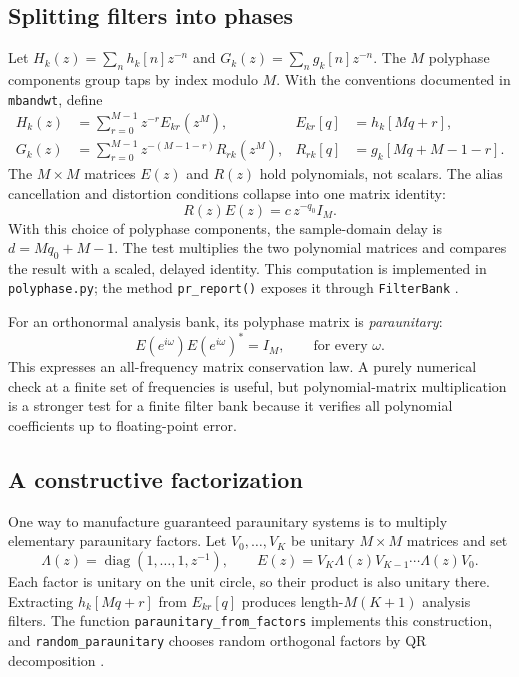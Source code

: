 \documentclass{article}
\theoremstyle{definition}
\theoremstyle{remark}
\newcommand{\code}[1]{\texttt{#1}}
\DeclareMathOperator{\diag}{diag}
\begin{document}
\subsection{Splitting filters into phases}
Let $H_k(z)=\sum_n h_k[n]z^{-n}$ and $G_k(z)=\sum_n g_k[n]z^{-n}$. The $M$ polyphase components group taps by index modulo $M$. With the conventions documented in \texttt{mbandwt}, define
\begin{align}
H_k(z)&=\sum_{r=0}^{M-1}z^{-r}E_{kr}(z^M),
& E_{kr}[q]&=h_k[Mq+r],\label{eq:polyE}\\
G_k(z)&=\sum_{r=0}^{M-1}z^{-(M-1-r)}R_{rk}(z^M),
& R_{rk}[q]&=g_k[Mq+M-1-r].\label{eq:polyR}
\end{align}
The $M\times M$ matrices $E(z)$ and $R(z)$ hold polynomials, not scalars. The alias cancellation and distortion conditions collapse into one matrix identity:
\begin{equation}
\boxed{R(z)E(z)=c\,z^{-q_0}I_M.}
\label{eq:polypr}
\end{equation}
With this choice of polyphase components, the sample-domain delay is $d=Mq_0+M-1$. The test multiplies the two polynomial matrices and compares the result with a scaled, delayed identity. This computation is implemented in \code{polyphase.py}; the method \code{pr\_report()} exposes it through \code{FilterBank} \cite{su2026}.

For an orthonormal analysis bank, its polyphase matrix is \emph{paraunitary}:
\begin{equation}
E(e^{i\omega})E(e^{i\omega})^*=I_M,
\qquad\text{for every }\omega.
\label{eq:paraunitary}
\end{equation}
This expresses an all-frequency matrix conservation law. A purely numerical check at a finite set of frequencies is useful, but polynomial-matrix multiplication is a stronger test for a finite filter bank because it verifies all polynomial coefficients up to floating-point error.

\subsection{A constructive factorization}
One way to manufacture guaranteed paraunitary systems is to multiply elementary paraunitary factors. Let $V_0,\ldots,V_K$ be unitary $M\times M$ matrices and set
\begin{equation}
\Lambda(z)=\diag(1,\ldots,1,z^{-1}),
\qquad E(z)=V_K\Lambda(z)V_{K-1}\cdots\Lambda(z)V_0.
\label{eq:factored}
\end{equation}
Each factor is unitary on the unit circle, so their product is also unitary there. Extracting $h_k[Mq+r]$ from $E_{kr}[q]$ produces length-$M(K+1)$ analysis filters. The function \code{paraunitary\_from\_factors} implements this construction, and \code{random\_paraunitary} chooses random orthogonal factors by QR decomposition \cite{su2026,vaidyanathan1993}.
\end{document}
